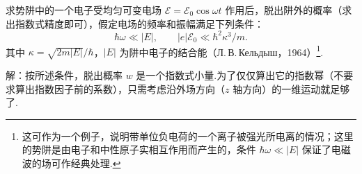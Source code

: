 \begin{xiti}
\quad 求势阱中的一个电子受均匀可变电场 $\mathcal{E}=\mathcal{E}_0\cos\omega t$ 作用后，脱出阱外的概率（求出指数式精度即可），假定电场的频率和振幅满足下列条件：
\begin{equation*}
  \hbar\omega\ll|E|,
  \qquad
  |e|\mathcal{E}_0\ll\hbar^{2}\kappa^{3}/m.
\end{equation*}
其中 $\kappa=\sqrt{2m|E|}/\hbar$，$|E|$ 为阱中电子的结合能（Л.\,В.\,Кельдыш，1964）\footnote{这可作为一个例子，说明带单位负电荷的一个离子被强光所电离的情况；这里的势阱是由电子和中性原子实相互作用而产生的，条件 $\hbar\omega\ll|E|$ 保证了电磁波的场可作经典处理.}.

解：按所述条件，脱出概率 $w$ 是一个指数式小量.为了仅仅算出它的指数幂（不要求算出指数因子前的系数），只需考虑沿外场方向（$z$ 轴方向）的一维运动就足够了.


\end{xiti}
